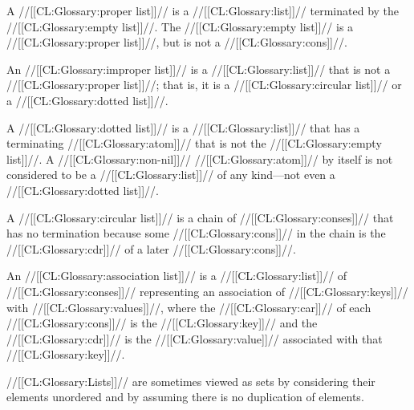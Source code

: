 A //[[CL:Glossary:proper list]]// is a //[[CL:Glossary:list]]// terminated by the //[[CL:Glossary:empty list]]//. The //[[CL:Glossary:empty list]]// is a //[[CL:Glossary:proper list]]//, but is not a //[[CL:Glossary:cons]]//.

An //[[CL:Glossary:improper list]]// is a //[[CL:Glossary:list]]// that is not a //[[CL:Glossary:proper list]]//; that is, it is a //[[CL:Glossary:circular list]]// or a //[[CL:Glossary:dotted list]]//.

A //[[CL:Glossary:dotted list]]// is a //[[CL:Glossary:list]]// that has a terminating //[[CL:Glossary:atom]]// that is not the //[[CL:Glossary:empty list]]//.  A //[[CL:Glossary:non-nil]]// //[[CL:Glossary:atom]]// by itself is not considered to be a //[[CL:Glossary:list]]// of any kind---not even a //[[CL:Glossary:dotted list]]//.

A //[[CL:Glossary:circular list]]// is a chain of //[[CL:Glossary:conses]]// that has no termination  because some //[[CL:Glossary:cons]]// in the chain is the //[[CL:Glossary:cdr]]// of a later //[[CL:Glossary:cons]]//.


An //[[CL:Glossary:association list]]// is a //[[CL:Glossary:list]]// of //[[CL:Glossary:conses]]//  representing an association of //[[CL:Glossary:keys]]// with //[[CL:Glossary:values]]//,  where the //[[CL:Glossary:car]]// of each //[[CL:Glossary:cons]]// is the //[[CL:Glossary:key]]//  and the //[[CL:Glossary:cdr]]// is the //[[CL:Glossary:value]]// associated with that //[[CL:Glossary:key]]//.


\endsubsubsection%


//[[CL:Glossary:Lists]]// are sometimes viewed as sets by considering their elements unordered and by assuming there is no duplication of elements.


